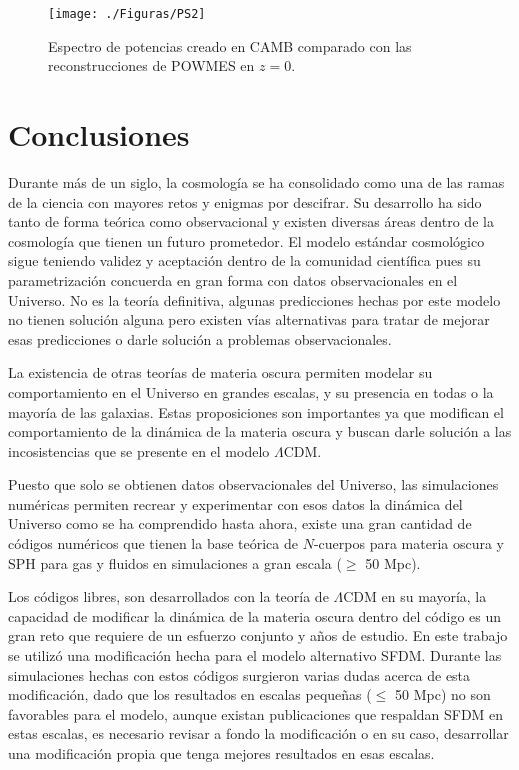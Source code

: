 \documentclass[a4paper,openright,10pt, oneside, final]{book}
\begin{document}
\begin{figure}
\centering
\texttt{[image: ./Figuras/PS2]}
\caption{\footnotesize{Espectro de potencias creado en CAMB comparado con las reconstrucciones de POWMES en $z=0$.}}
\end{figure}




\chapter{Conclusiones}
Durante más de un siglo, la cosmología se ha consolidado como una de las ramas de la ciencia con mayores retos y enigmas por descifrar. Su desarrollo ha sido tanto de forma teórica como observacional y existen diversas áreas dentro de la cosmología que tienen un futuro prometedor. El modelo estándar cosmológico sigue teniendo validez y aceptación dentro de la comunidad científica pues su parametrización concuerda en gran forma con datos observacionales en el Universo. No es la teoría definitiva, algunas predicciones hechas por este modelo no tienen solución alguna pero existen vías alternativas para tratar de mejorar esas predicciones o darle solución a problemas observacionales. 

La existencia de otras teorías de materia oscura permiten modelar su comportamiento en el Universo en grandes escalas, y su presencia en todas o la mayoría de las galaxias. Estas proposiciones son importantes ya que modifican el comportamiento de la dinámica de la materia oscura y buscan darle solución a las incosistencias que se presente en el modelo $\Lambda$CDM. 

Puesto que solo se obtienen datos observacionales del Universo, las simulaciones numéricas permiten recrear y experimentar con esos datos la dinámica del Universo como se ha comprendido hasta ahora, existe una gran cantidad de códigos numéricos que tienen la base teórica de $N$-cuerpos para materia oscura y SPH para gas y fluidos en simulaciones a gran escala ($\geq$ 50 Mpc).

Los códigos libres, son desarrollados con la teoría de $\Lambda$CDM en su mayoría, la capacidad de modificar la dinámica de la materia oscura dentro del código es un gran reto que requiere de un esfuerzo conjunto y años de estudio. En este trabajo se utilizó una modificación hecha para el modelo alternativo SFDM. Durante las simulaciones hechas con estos códigos surgieron varias dudas acerca de esta modificación, dado que los resultados en escalas pequeñas ($\leq$ 50 Mpc) no son favorables para el modelo, aunque existan publicaciones que respaldan SFDM en estas escalas, es necesario revisar a fondo la modificación o en su caso, desarrollar una modificación propia que tenga mejores resultados en esas escalas.
\end{document}
